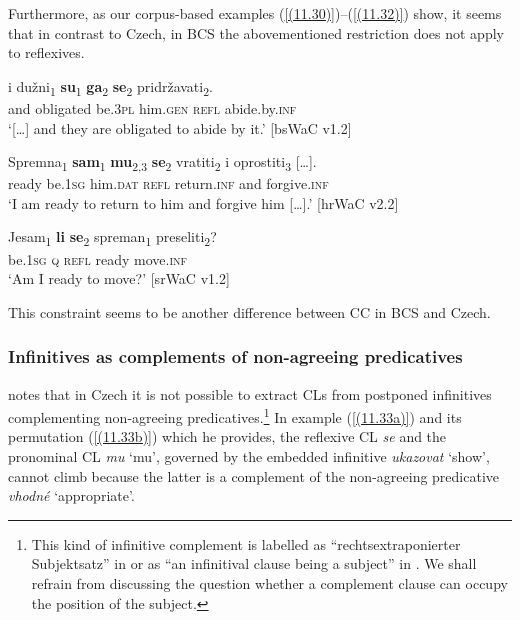 \noindent Furthermore, as our corpus-based examples (\ref{(11.30)})--(\ref{(11.32)}) show, it seems that in contrast to Czech, in BCS the abovementioned restriction does not apply to reflexives. 

\begin{exe}\ex\label{(11.30)}
\gll [\dots] i dužni\textsubscript{1} \textbf{su}\textsubscript{1} \textbf{ga}\textsubscript{2} \textbf{se}\textsubscript{2} pridržavati\textsubscript{2}. \\
{} and obligated be.3\textsc{pl} him.\textsc{gen} \textsc{refl} abide.by.\textsc{inf} \\
\glt ‘[\dots] and they are obligated to abide by it.’
\hfill [bsWaC v1.2]

\ex\label{(11.31)}
\gll Spremna\textsubscript{1} \textbf{sam}\textsubscript{1} \textbf{mu}\textsubscript{2,3} \textbf{se}\textsubscript{2} vratiti\textsubscript{2} i {oprostiti\textsubscript{3} [\dots].} \\
ready be.1\textsc{sg} him.\textsc{dat} \textsc{refl} return.\textsc{inf} and forgive.\textsc{inf} \\
\glt ‘I am ready to return to him and forgive him [\dots].’
\hfill [hrWaC v2.2]

\ex\label{(11.32)}
\gll Jesam\textsubscript{1} \textbf{li} \textbf{se}\textsubscript{2} spreman\textsubscript{1} preseliti\textsubscript{2}? \\
be.1\textsc{sg} \textsc{q} \textsc{refl} ready move.\textsc{inf} \\
\glt ‘Am I ready to move?’
\hfill [srWaC v1.2]
\end{exe}

\noindent This constraint seems to be another difference between CC in BCS and Czech. 

\subsubsection{Infinitives as complements of non-agreeing predicatives}
\label{Infinitives as complements of non-agreeing predicatives}

\citet[77]{Junghanns02} notes that in Czech it is not possible to extract CLs from postponed infinitives complementing non-agreeing predicatives.\footnote{This kind of infinitive complement is labelled as “rechtsextraponierter Subjektsatz” in \citet[77]{Junghanns02} or as “an infinitival clause being a subject” in \citet[82]{Dotlacil04}. We shall refrain from discussing the question whether a complement clause can occupy the position of the subject.} In example (\ref{(11.33a)}) and its permutation (\ref{(11.33b)}) which he provides, the reflexive CL \textit{se} and the pronominal CL \textit{mu} ‘mu’, governed by the embedded infinitive \textit{ukazovat} ‘show’, cannot climb because the latter is a complement of the non-agreeing predicative \textit{vhodné} ‘appropriate’. 

